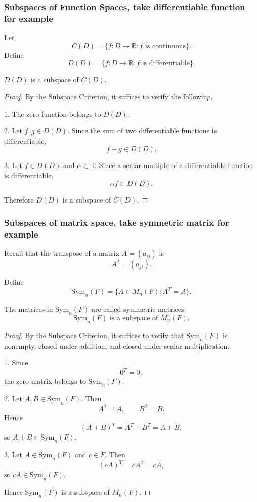 \documentclass[12pt]{article}
\begin{document}
\subsubsection{Subspaces of Function Spaces, take differentiable function for example}

Let
\[
C(D) = \{f:D\to\mathbb R:f\text{ is continuous}\}.
\]
Define
\[
D(D) = \{f:D\to\mathbb R:f\text{ is differentiable}\}.
\]

\bigskip

$D(D)$ is a subspace of $C(D)$.

\begin{proof}
By the Subspace Criterion, it suffices to verify the following.

\bigskip

1. The zero function belongs to $D(D)$.

2. Let $f,g\in D(D)$. Since the sum of two differentiable
functions is differentiable,
\[
f+g\in D(D).
\]

\bigskip

3. Let $f\in D(D)$ and $\alpha\in\mathbb R$. Since a scalar
multiple of a differentiable function is differentiable,
\[
\alpha f\in D(D).
\]

\bigskip

Therefore $D(D)$ is a subspace of $C(D)$.
\end{proof}

\subsubsection{Subspaces of matrix space, take symmetric matrix for example}

Recall that the transpose of a matrix $A = (a_{ij})$ is
\[
A^T = (a_{ji}).
\]

Define
\[
\mathrm{Sym}_n(F) = \{A\in M_n(F):A^T=A\}.
\]

The matrices in $\mathrm{Sym}_n(F)$ are called symmetric matrices.
\[
\mathrm{Sym}_n(F) \text{ is a subspace of } M_n(F).
\]

\begin{proof}
By the Subspace Criterion, it suffices to verify that
$\mathrm{Sym}_n(F)$ is nonempty, closed under addition,
and closed under scalar multiplication.

\bigskip

1. Since
\[
0^T = 0,
\]
the zero matrix belongs to $\mathrm{Sym}_n(F)$.

\bigskip

2. Let $A,B\in\mathrm{Sym}_n(F)$. Then
\[
A^T = A, \qquad B^T = B.
\]
Hence
\[
(A + B)^T = A^T + B^T = A + B,
\]
so $A + B\in\mathrm{Sym}_n(F)$.

\bigskip

3. Let $A\in\mathrm{Sym}_n(F)$ and $c\in F$. Then
\[
(cA)^T = cA^T = cA,
\]
so $cA\in\mathrm{Sym}_n(F)$.

\bigskip

Hence $\mathrm{Sym}_n(F)$ is a subspace of $M_n(F)$.

\end{proof}
\end{document}
